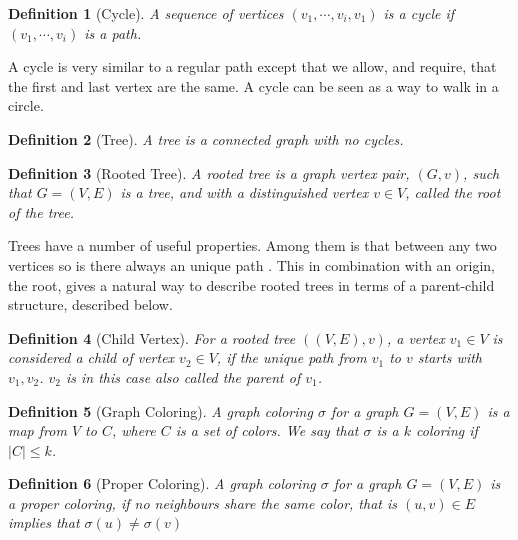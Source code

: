 \documentclass[a4paper]{article}
\newtheorem{definition}{Definition}[section]
\begin{document}
\begin{definition}[Cycle]
    A sequence of vertices $(v_1,\cdots,v_i,v_1)$ is a cycle
    if $(v_1,\cdots,v_i)$ is a path.
\end{definition}

A cycle is very similar to a regular path except that we allow, and require,
that the first and last vertex are the same. A cycle can be seen as a way to walk
in a circle. 

\begin{definition}[Tree]{\cite{Trees}}
    A tree is a connected graph with no cycles.
\end{definition}
\begin{definition}[Rooted Tree]{\cite{Trees}}
    A rooted tree is a graph vertex pair, $(G,v)$, such that $G = (V,E)$ is a tree,
    and with a distinguished vertex $v \in V$, called the root of the tree.
\end{definition}

Trees have a number of useful properties. Among them is that between any two
vertices so is there always an unique path \cite{Trees}. This in combination
with an origin, the root, gives a natural way to describe rooted trees in terms
of a parent-child structure, described below.

\begin{definition}[Child Vertex]{\cite{Trees}}
    For a rooted tree $((V,E),v)$, a vertex $v_1 \in V$ is considered a child
    of vertex $v_2 \in V$, if the unique path from $v_1$ to $v$ starts with
    $v_1,v_2$. $v_2$ is in this case also called the parent of $v_1$.
\end{definition}


\begin{definition}[Graph Coloring]
    A graph coloring $\sigma$ for a graph $G = (V,E)$ is a map from $V$ to $C$,
    where $C$ is a set of colors. We say that $\sigma$
    is a $k$ coloring if $|C| \leq k$.
\end{definition}

\begin{definition}[Proper Coloring]
    A graph coloring $\sigma$ for a graph $G = (V,E)$ is a proper coloring,
    if no neighbours share the same color,
    that is $(u,v) \in E$ implies that $\sigma(u) \neq \sigma(v)$
\end{definition}
\end{document}
